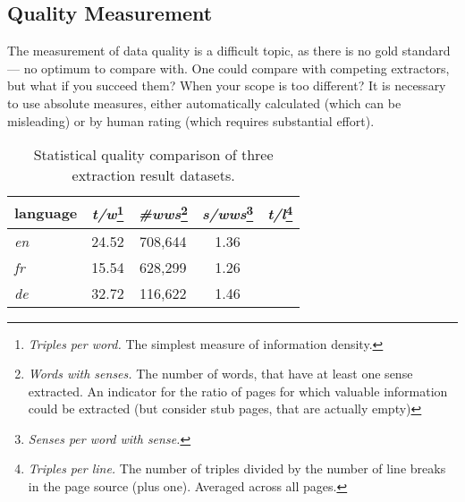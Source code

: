\subsection{Quality Measurement}
The measurement of data quality is a difficult topic, as there is no gold standard --- no optimum to compare with. 
One could compare with competing extractors, but what if you succeed them? 
When your scope is too different? 
It is necessary to use absolute measures, either automatically calculated (which can be misleading) or by human rating (which requires substantial effort).

\begin{table}[h!]
\centering
\caption{Statistical quality comparison of three \wik extraction result datasets.}
\begin{minipage}{\textwidth}
\centering
\begin{tabular}{|l|c|c|c|c|}
\hline language & \emph{t/w}\footnote{\textit{Triples per word.} The simplest measure of information density.} & \emph{\#wws}\footnote{\textit{Words with senses.} The number of words, that have at least one sense  extracted. 
An indicator for the ratio of pages for which valuable information could be extracted (but consider stub pages, that are actually empty)} & \emph{s/wws}\footnote{\textit{Senses per word with sense.}} & \emph{t/l}\footnote{\textit{Triples per line.} The number of triples divided by the number of line breaks in the page source (plus one). Averaged across all pages.} \\
\hline \hline \textit{en} & 24.52 & 708,644 & 1.36 & \\
\hline \textit{fr} & 15.54 & 628,299 & 1.26 & \\ 
\hline \textit{de} & 32.72 & 116,622 & 1.46 & \\ 
\hline 
\end{tabular} 

\end{minipage}

\end{table}

